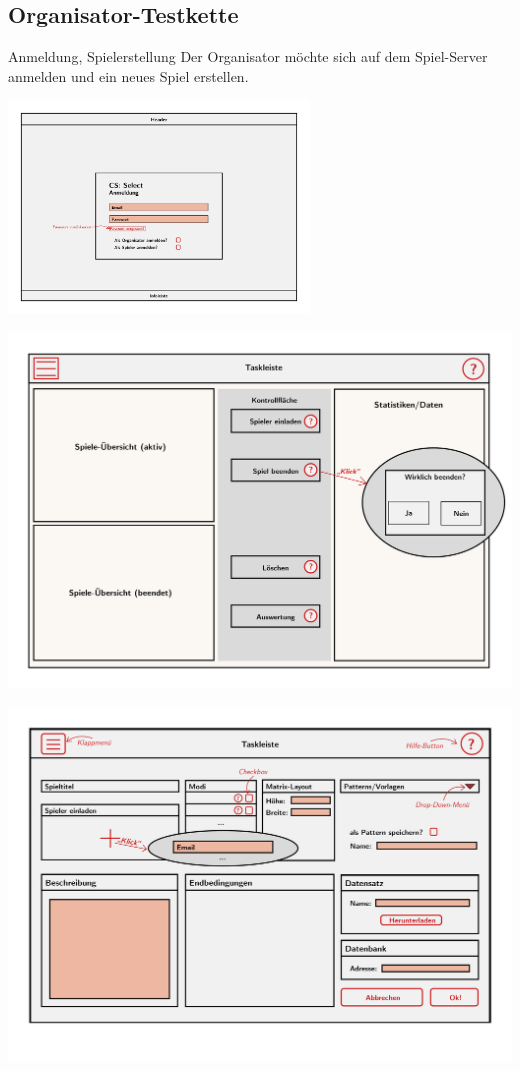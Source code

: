 \documentclass[xcolor=dvipsnames]{beamer}
\begin{document}
    \subsection{Organisator-Testkette}
    \begin{frame}
        \begin{block} {Anmeldung, Spielerstellung}
            Der Organisator möchte sich auf dem Spiel-Server anmelden und ein neues Spiel erstellen.
        \end{block}
        \includegraphics[width=8cm]{../../pictures/Anmeldung.jpg}
    \end{frame}
    \begin{frame}
        \includegraphics[width=\textwidth]{../../pictures/2_Organisator.jpg}
    \end{frame}
    \begin{frame}
         \includegraphics[width=\textwidth]{../../pictures/Spielerstellung.jpg}
    \end{frame}
\end{document}

